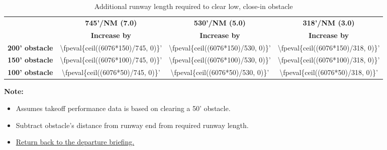 \begin{table}[ht]
    \hypertarget{runway-length-table}{\caption{Additional runway length required to clear low, close-in obstacle}}

    \begin{center}
        \begin{tabular}{lccc}
            \toprule
                                   & \multicolumn{1}{c}{\textbf{745'/NM (7.0\textdegree{})}} & \multicolumn{1}{c}{\textbf{530'/NM (5.0\textdegree{})}} & \multicolumn{1}{c}{\textbf{318'/NM (3.0\textdegree{})}}
            \\\cmidrule(lr){2-2}\cmidrule(lr){3-3}\cmidrule(lr){4-4}
                                   & \textbf{Increase by}                                    & \textbf{Increase by}                                    & \textbf{Increase by}                                    \\\midrule
            \textbf{200' obstacle} & \num{\fpeval{ceil((6076*150)/745, 0)}}'                 & \num{\fpeval{ceil((6076*150)/530, 0)}}'                 & \num{\fpeval{ceil((6076*150)/318, 0)}}'                 \\
            \textbf{150' obstacle} & \num{\fpeval{ceil((6076*100)/745, 0)}}'                 & \num{\fpeval{ceil((6076*100)/530, 0)}}'                 & \num{\fpeval{ceil((6076*100)/318, 0)}}'                 \\
            \textbf{100' obstacle} & \num{\fpeval{ceil((6076*50)/745, 0)}}'                  & \num{\fpeval{ceil((6076*50)/530, 0)}}'                  & \num{\fpeval{ceil((6076*50)/318, 0)}}'                  \\
            \bottomrule
        \end{tabular}
    \end{center}

    \textbf{Note:}
    \begin{itemize}
        \item Assumes takeoff performance data is based on clearing a 50' obstacle.
        \item Subtract obstacle's distance from runway end from required runway length.
        \item \hyperlink{departure-briefing}{Return back to the departure briefing.}
    \end{itemize}
\end{table}

